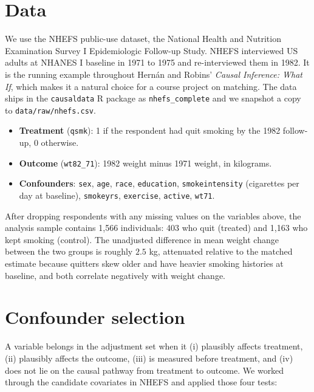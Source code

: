\documentclass[11pt]{article}
\begin{document}
\section{Data}

We use the NHEFS public-use dataset, the National Health and Nutrition
Examination Survey I Epidemiologic Follow-up Study. NHEFS interviewed US
adults at NHANES I baseline in 1971 to 1975 and re-interviewed them in
1982. It is the running example throughout Hern\'an and Robins'
\textit{Causal Inference: What If}, which makes it a natural choice for a
course project on matching. The data ships in the \texttt{causaldata} R
package as \texttt{nhefs\_complete} and we snapshot a copy to
\texttt{data/raw/nhefs.csv}.

\begin{itemize}[leftmargin=1.4em, itemsep=0.1em]
  \item \textbf{Treatment} (\texttt{qsmk}): 1 if the respondent had quit
  smoking by the 1982 follow-up, 0 otherwise.
  \item \textbf{Outcome} (\texttt{wt82\_71}): 1982 weight minus 1971 weight,
  in kilograms.
  \item \textbf{Confounders}: \texttt{sex}, \texttt{age}, \texttt{race},
  \texttt{education}, \texttt{smokeintensity} (cigarettes per day at
  baseline), \texttt{smokeyrs}, \texttt{exercise}, \texttt{active},
  \texttt{wt71}.
\end{itemize}

After dropping respondents with any missing values on the variables above,
the analysis sample contains 1{,}566 individuals: 403 who quit (treated)
and 1{,}163 who kept smoking (control). The unadjusted difference in mean
weight change between the two groups is roughly $2.5$ kg, attenuated
relative to the matched estimate because quitters skew older and have
heavier smoking histories at baseline, and both correlate negatively with
weight change.

\section{Confounder selection}

A variable belongs in the adjustment set when it (i) plausibly affects
treatment, (ii) plausibly affects the outcome, (iii) is measured before
treatment, and (iv) does not lie on the causal pathway from treatment to
outcome. We worked through the candidate covariates in NHEFS and applied
those four tests:
\end{document}
